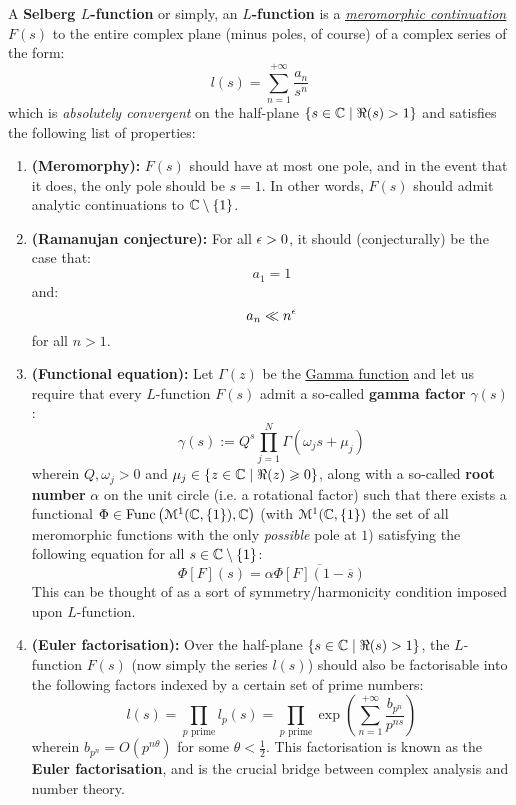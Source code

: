                 \begin{definition} \label{def: selberg_L_functions} 
                    A \textbf{Selberg $L$-function} or simply, an \textbf{$L$-function} is a \textit{\href{https://en.wikipedia.org/wiki/Analytic_continuation}{\underline{meromorphic continuation}}} $F(s)$ to the entire complex plane (minus poles, of course) of a complex series of the form:
                        $$l(s) = \sum_{n = 1}^{+\infty} \frac{a_n}{s^n}$$
                    which is \textit{absolutely convergent} on the half-plane $\{s \in \mathbb{C} \mid \Re(s) > 1 \}$ and satisfies the following list of properties:
                        \begin{enumerate}
                            \item \textbf{(Meromorphy):} $F(s)$ should have at most one pole, and in the event that it does, the only pole should be $s = 1$. In other words, $F(s)$ should admit analytic continuations to $\mathbb{C} \setminus \{1\}$.
                            \item \textbf{(Ramanujan conjecture):} For all $\epsilon > 0$, it should (conjecturally) be the case that:
                                $$a_1 = 1$$
                            and:
                                $$a_n \ll n^{\epsilon}$$
                            for all $n > 1$. 
                            \item \textbf{(Functional equation):} Let $\Gamma(z)$ be the \href{https://en.wikipedia.org/wiki/Gamma_function}{\underline{Gamma function}} and let us require that every $L$-function $F(s)$ admit a so-called \textbf{gamma factor} $\gamma(s)$:
                                $$\gamma(s) := Q^s \prod_{j = 1}^N \Gamma(\omega_j s + \mu_j)$$
                            wherein $Q, \omega_j > 0$ and $\mu_j \in \{z \in \mathbb{C} \mid \Re(z) \geqslant 0\}$, along with a so-called \textbf{root number} $\alpha$ on the unit circle (i.e. a rotational factor) such that there exists a functional $\Phi \in \mathrm{Func}\left(\mathcal{M}^1(\mathbb{C}, \{1\}), \mathbb{C}\right)$ (with $\mathcal{M}^1(\mathbb{C}, \{1\})$ the set of all meromorphic functions with the only \textit{possible} pole at $1$) satisfying the following equation for all $s \in \mathbb{C} \setminus \{1\}$:
                                $$\Phi[F](s) = \alpha \overline{\Phi[F](1 - \overline{s})}$$
                            This can be thought of as a sort of symmetry/harmonicity condition imposed upon $L$-function.
                            \item \textbf{(Euler factorisation):} Over the half-plane $\{s \in \mathbb{C} \mid \Re(s) > 1 \}$, the $L$-function $F(s)$ (now simply the series $l(s)$) should also be factorisable into the following factors indexed by a certain set of prime numbers:
                                $$l(s) = \prod_{\text{$p$ prime}} l_p(s) = \prod_{\text{$p$ prime}} \exp\left( \sum_{n = 1}^{+\infty} \frac{b_{p^n}}{p^{n s}} \right)$$
                            wherein $b_{p^n} = O(p^{n\theta})$ for some $\theta < \frac12$. This factorisation is known as the \textbf{Euler factorisation}, and is the crucial bridge between complex analysis and number theory.
                        \end{enumerate}
                \end{definition}
